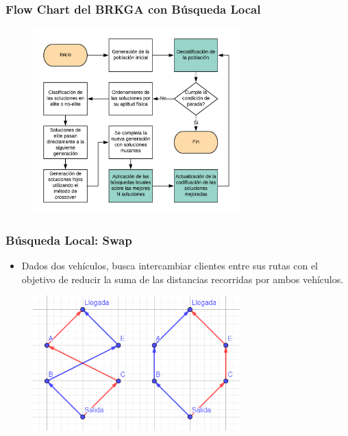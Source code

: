 \documentclass{beamer}
\begin{document}
\begin{frame}
\frametitle{Flow Chart del BRKGA con Búsqueda Local}

\begin{figure}[h]
	\centering
	\includegraphics[width=8cm]{BRKGA_Flow_Chart_Implementado}
	\label{fig:BRKGA_Flow_Chart_Implementado}
\end{figure}

\end{frame}


\begin{frame}
\frametitle{Búsqueda Local: Swap}

\begin{itemize}
    \item Dados dos vehículos, busca intercambiar clientes entre sus rutas con el objetivo de reducir la suma de las distancias recorridas por ambos vehículos.
\end{itemize}

\begin{figure}[h]
	\centering
	\includegraphics[width=8cm]{blswap}
	\label{fig:blswap}
\end{figure}

\end{frame}
\end{document}
